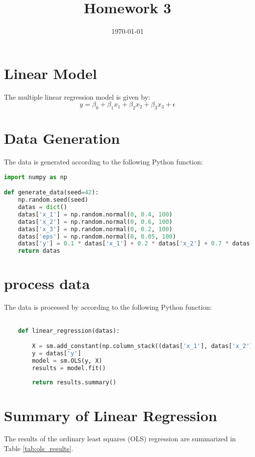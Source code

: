\documentclass[12pt]{article}
\title{Homework 3}
\date{\today}
\begin{document}
\maketitle

\section{Linear Model}
The multiple linear regression model is given by:
\[
y = \beta_0 + \beta_1 x_1 + \beta_2 x_2 + \beta_3 x_3 + \epsilon
\]

\section{Data Generation}
The data is generated according to the following Python function:

\begin{lstlisting}[language=Python, caption=Data Generation]
import numpy as np

def generate_data(seed=42):
    np.random.seed(seed)
    datas = dict()
    datas['x_1'] = np.random.normal(0, 0.4, 100)
    datas['x_2'] = np.random.normal(0, 0.6, 100)
    datas['x_3'] = np.random.normal(0, 0.2, 100)
    datas['eps'] = np.random.normal(0, 0.05, 100)
    datas['y'] = 0.1 * datas['x_1'] + 0.2 * datas['x_2'] + 0.7 * datas['x_3'] + datas['eps']
    return datas
\end{lstlisting}

\section{process data}
The data is processed by according to the following Python function:

\begin{lstlisting}[language=Python, caption=Data Generation]

    def linear_regression(datas):

        X = sm.add_constant(np.column_stack((datas['x_1'], datas['x_2'], datas['x_3'])))
        y = datas['y']
        model = sm.OLS(y, X)
        results = model.fit()
        
        return results.summary()
\end{lstlisting}

\section{Summary of Linear Regression}
The results of the ordinary least squares (OLS) regression are summarized in Table \ref{tab:ols_results}.
\end{document}
